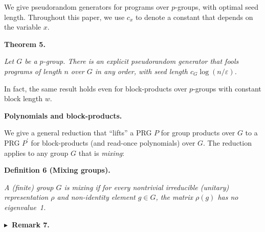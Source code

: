 We give pseudorandom generators for programs over $p$-groups, with
optimal seed length. Throughout this paper, we use $c_{x}$ to denote a constant that depends on the variable $x$.\par





\par\medskip\noindent\textbf{
\textbf{Theorem 5}\textbf{.}
}\par



\emph{Let $G$ be a $p$-group. There is an
explicit pseudorandom generator that fools programs of length $n$
over $G$ in any order, with seed length $c_{G}\log(n/\varepsilon)$.}\par






In fact, the same result holds even for block-products over $p$-groups
with constant block length $w$.\par




\par\medskip\noindent\textbf{Polynomials and block-products.}\par




We give a general reduction that “lifts” a PRG $P$ for group
products over $G$ to a PRG $P^{\prime}$ for block-products (and read-once
polynomials) over $G$. The reduction applies to any group $G$ that is \emph{mixing}:\par





\par\medskip\noindent\textbf{
\textbf{Definition 6}\textbf{ }(Mixing groups)\textbf{.}
}\par



\emph{A (finite) group $G$ is mixing if for every nontrivial irreducible (unitary) representation $\rho$ and non-identity element $g\in G$, the matrix $\rho(g)$ has no eigenvalue 1.}\par







\par\medskip\noindent\textbf{
$\blacktriangleright$ Remark 7.
}\par



